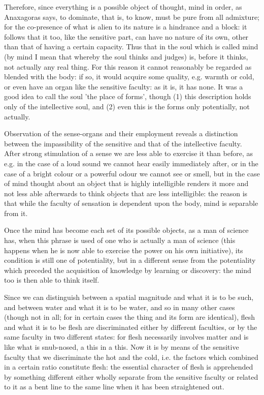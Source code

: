 Therefore, since everything is a possible object of thought, mind
in order, as Anaxagoras says, to dominate, that is, to know, must
be pure from all admixture; for the co-presence of what is alien to
its nature is a hindrance and a block: it follows that it too, like
the sensitive part, can have no nature of its own, other than that
of having a certain capacity. Thus that in the soul which is called
mind (by mind I mean that whereby the soul thinks and judges) is,
before it thinks, not actually any real thing. For this reason it
cannot reasonably be regarded as blended with the body: if so, it
would acquire some quality, e.g. warmth or cold, or even have an organ
like the sensitive faculty: as it is, it has none. It was a good idea
to call the soul 'the place of forms', though (1) this description
holds only of the intellective soul, and (2) even this is the forms
only potentially, not actually. 

Observation of the sense-organs and their employment reveals a distinction
between the impassibility of the sensitive and that of the intellective
faculty. After strong stimulation of a sense we are less able to exercise
it than before, as e.g. in the case of a loud sound we cannot hear
easily immediately after, or in the case of a bright colour or a powerful
odour we cannot see or smell, but in the case of mind thought about
an object that is highly intelligible renders it more and not less
able afterwards to think objects that are less intelligible: the reason
is that while the faculty of sensation is dependent upon the body,
mind is separable from it. 

Once the mind has become each set of its possible objects, as a man
of science has, when this phrase is used of one who is actually a
man of science (this happens when he is now able to exercise the power
on his own initiative), its condition is still one of potentiality,
but in a different sense from the potentiality which preceded the
acquisition of knowledge by learning or discovery: the mind too is
then able to think itself. 

Since we can distinguish between a spatial magnitude and what it is
to be such, and between water and what it is to be water, and so in
many other cases (though not in all; for in certain cases the thing
and its form are identical), flesh and what it is to be flesh are
discriminated either by different faculties, or by the same faculty
in two different states: for flesh necessarily involves matter and
is like what is snub-nosed, a this in a this. Now it is by means of
the sensitive faculty that we discriminate the hot and the cold, i.e.
the factors which combined in a certain ratio constitute flesh: the
essential character of flesh is apprehended by something different
either wholly separate from the sensitive faculty or related to it
as a bent line to the same line when it has been straightened out.

